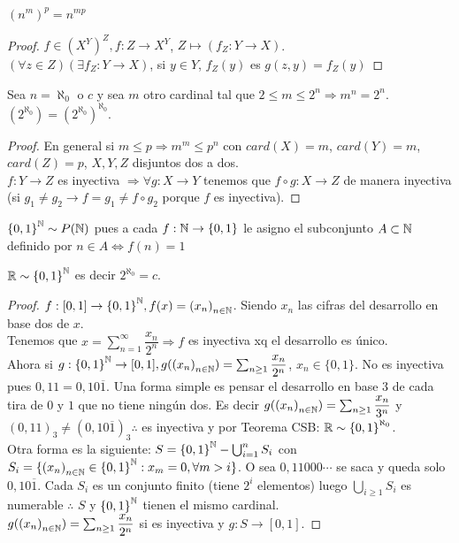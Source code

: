 \begin{prop}
  \({(n^m)}^p = n^{mp} \)
  \begin{proof}
    \(f \in {(X^Y)}^Z, f: Z \to X^Y\), \(Z \mapsto (f_Z: Y \to X)\). \\
    \((\forall z \in Z)(\exists f_Z: Y \to X)\), si \(y \in Y\), \(f_Z(y)\) es \(g(z, y) = f_Z(y)\)
  \end{proof}
\end{prop}

\begin{theorem}
  Sea \(n = \aleph_0\) o \(c\) y sea \(m\) otro cardinal tal que \(2 \leq m \leq 2^n \Rightarrow m^n = 2^n\). \((2^{\aleph_0}) = (2^{\aleph_0})^{\aleph_0} \).
  \begin{proof}
    En general si \(m \leq p \Rightarrow m^m \leq p^n\) con \(card(X) = m\), \(card(Y) = m\), \(card(Z) = p\), \(X,Y,Z\) disjuntos dos a dos. \\
    \(f: Y \to Z\) es inyectiva \(\Rightarrow \forall g: X \to Y\) tenemos que \(f \circ g: X \to Z\) de manera inyectiva (si \(g_1 \neq g_2 \to f = g_1 \neq f \circ g_2\) porque \(f\) es inyectiva).
  \end{proof}
\end{theorem}

\begin{note}
  \( {\{ 0, 1 \}}^{\mathbb{N}} \sim P(\mathbb{N})\) pues a cada \(f: \mathbb{N} \to \{0, 1\} \) le asigno el subconjunto \(A \subset \mathbb{N} \) definido por \(n \in A \iff f(n) = 1\)
\end{note}

\begin{theorem}
  \(\mathbb{R} \sim {\{ 0, 1 \}}^{\mathbb{N}} \) es decir \(2^{\aleph_0} = c\).
  \begin{proof}
    \(f: [0, 1] \to {\{ 0, 1 \}}^{\mathbb{N}}, f(x) = {(x_n)}_{n \in \mathbb{N}} \). Siendo \(x_n\) las cifras del desarrollo en base dos de \(x\). \\
    Tenemos que \(x = \sum_{n=1}^\infty \dfrac{x_n}{2^n} \Rightarrow f\) es inyectiva xq el desarrollo es único. \\
    Ahora si \(g: {\{ 0, 1 \}}^{\mathbb{N}} \to [0, 1], g({(x_n)}_{n \in \mathbb{N}}) = \sum_{n \geq 1} \dfrac{x_n}{2^n} \), \(x_n \in \{0, 1\} \). No es inyectiva pues \(0,11 = 0,10\overline{1} \).
    Una forma simple es pensar el desarrollo en base \(3\) de cada tira de \(0\) y \(1\) que no tiene ningún dos. Es decir \(g({(x_n)}_{n \in \mathbb{N}}) = \sum_{n \geq 1} \dfrac{x_n}{3^n} \) y \({(0,11)}_3 \neq (0,10\overline{1})_3 \therefore \)
    es inyectiva y por Teorema CSB: \(\mathbb{R} \sim {\{0,1\}}^{\aleph_0} \). \\
    Otra forma es la siguiente:
    \(S = {\{0, 1\}}^{\mathbb{N}} - \bigcup_{i=1}^n S_i\) con \(S_i = \{ {(x_n)}_{n \in \mathbb{N}} \in {\{0, 1\}}^{\mathbb{N}} : x_m = 0, \forall m > i \} \). O sea \(0,11000\cdots \) se saca y queda solo \(0,10\overline{1} \).
    Cada \(S_i\) es un conjunto finito (tiene \(2^i\) elementos) luego \(\bigcup_{i \geq 1} S_i\) es numerable \(\therefore \) \(S\) y \({\{0, 1\}}^{\mathbb{N}} \) tienen el mismo cardinal. \\
    \(g({(x_n)}_{n \in \mathbb{N}}) = \sum_{n \geq 1} \dfrac{x_n}{2^n} \) si es inyectiva y \(g: S \to [0, 1]\).
  \end{proof}
\end{theorem}

